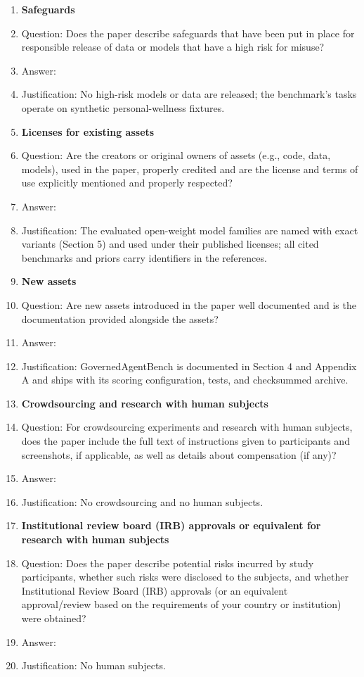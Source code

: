 \documentclass{article}
\begin{document}
\begin{enumerate}
\item {\bf Safeguards}
    \item[] Question: Does the paper describe safeguards that have been put in place for responsible release of data or models that have a high risk for misuse?
    \item[] Answer: \answerNA{}
    \item[] Justification: No high-risk models or data are released; the benchmark's tasks operate on synthetic personal-wellness fixtures.

\item {\bf Licenses for existing assets}
    \item[] Question: Are the creators or original owners of assets (e.g., code, data, models), used in the paper, properly credited and are the license and terms of use explicitly mentioned and properly respected?
    \item[] Answer: \answerYes{}
    \item[] Justification: The evaluated open-weight model families are named with exact variants (Section 5) and used under their published licenses; all cited benchmarks and priors carry identifiers in the references.

\item {\bf New assets}
    \item[] Question: Are new assets introduced in the paper well documented and is the documentation provided alongside the assets?
    \item[] Answer: \answerYes{}
    \item[] Justification: GovernedAgentBench is documented in Section 4 and Appendix A and ships with its scoring configuration, tests, and checksummed archive.

\item {\bf Crowdsourcing and research with human subjects}
    \item[] Question: For crowdsourcing experiments and research with human subjects, does the paper include the full text of instructions given to participants and screenshots, if applicable, as well as details about compensation (if any)?
    \item[] Answer: \answerNA{}
    \item[] Justification: No crowdsourcing and no human subjects.

\item {\bf Institutional review board (IRB) approvals or equivalent for research with human subjects}
    \item[] Question: Does the paper describe potential risks incurred by study participants, whether such risks were disclosed to the subjects, and whether Institutional Review Board (IRB) approvals (or an equivalent approval/review based on the requirements of your country or institution) were obtained?
    \item[] Answer: \answerNA{}
    \item[] Justification: No human subjects.


\end{enumerate}
\end{document}
